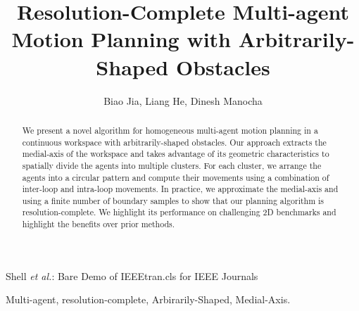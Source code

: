 \documentclass[journal]{IEEEtran}
\theoremstyle{definition}
\theoremstyle{plain}
\theoremstyle{definition}
\theoremstyle{remark}
\begin{document}
\title{Resolution-Complete Multi-agent Motion Planning with Arbitrarily-Shaped Obstacles}

\author{Biao Jia, Liang He, Dinesh Manocha}%


%
{Shell \MakeLowercase{\textit{et al.}}: Bare Demo of IEEEtran.cls for IEEE Journals}


\maketitle

\begin{abstract}
We present a novel algorithm for homogeneous multi-agent motion planning in a continuous workspace with arbitrarily-shaped obstacles. Our approach  extracts the medial-axis of the workspace and takes advantage of its geometric characteristics to spatially divide the agents into multiple clusters. For each cluster, we arrange the  agents into a circular pattern and compute their movements using a combination of inter-loop and intra-loop movements. In practice, we approximate the medial-axis and using a finite number of boundary samples to show that our planning algorithm is resolution-complete. We highlight its performance on challenging 2D benchmarks and highlight the benefits over prior methods.
\end{abstract}

\begin{IEEEkeywords}
Multi-agent, resolution-complete, Arbirarily-Shaped, Medial-Axis.
\end{IEEEkeywords}

\IEEEpeerreviewmaketitle









\ifCLASSOPTIONcaptionsoff
  \newpage
\fi




\end{document}
